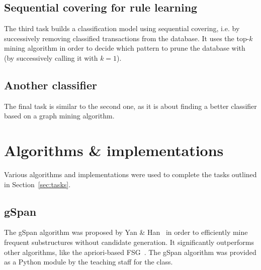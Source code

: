 \documentclass{sigkddExp}
\newcommand{\gspan}{\textsf{gSpan}}
\begin{document}
\subsection{Sequential covering for rule learning}
The third task builds a classification model using sequential covering, i.e. by successively removing classified transactions from the database.
It uses the top-\(k\) mining algorithm in order to decide which pattern to prune the database with (by successively calling it with \(k=1\)).

\subsection{Another classifier}
The final task is similar to the second one, as it is about finding a better classifier based on a graph mining algorithm.

\section{Algorithms \& implementations}
\label{sec:algs}
Various algorithms and implementations were used to complete the tasks outlined in Section~\ref{sec:tasks}.

\subsection{gSpan}
The \gspan{} algorithm was proposed by Yan \& Han~\cite{Yan2002} in order to efficiently mine frequent substructures without candidate generation.
It significantly outperforms other algorithms, like the apriori-based \textsf{FSG}~\cite{Kuramochi2004}.
The \gspan{} algorithm was provided as a Python module by the teaching staff for the class.
\end{document}
